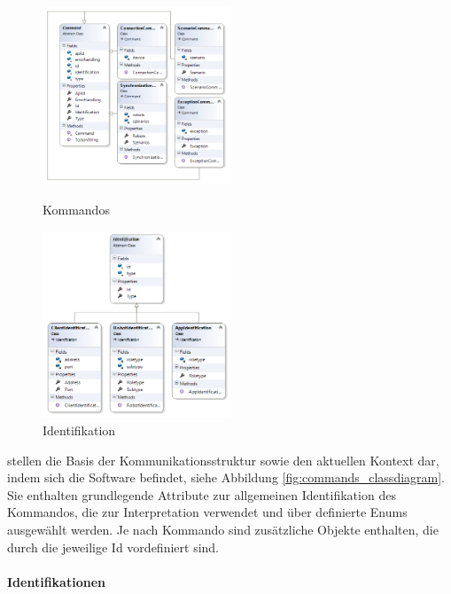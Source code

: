 \begin{figure}
	\begin{center}
		\includegraphics[width=0.5\textwidth]{images/uml/commands.png}
	\end{center}
	\caption{Kommandos}
	\label{fig:commands_classdiagram}
	\begin{center}
		\includegraphics[width=0.5\textwidth]{images/uml/identification.png}
	\end{center}
	\caption{Identifikation}
	\label{fig:identification_classdiagram}
\end{figure}

stellen die Basis der Kommunikationsstruktur sowie den aktuellen Kontext dar, indem sich die Software befindet, siehe Abbildung \eqref{fig:commands_classdiagram}. Sie enthalten grundlegende Attribute zur allgemeinen Identifikation des Kommandos, die zur Interpretation verwendet und über definierte Enums ausgewählt werden. Je nach Kommando sind zusätzliche Objekte enthalten, die durch die jeweilige Id vordefiniert sind.\\

\paragraph{Identifikationen}

